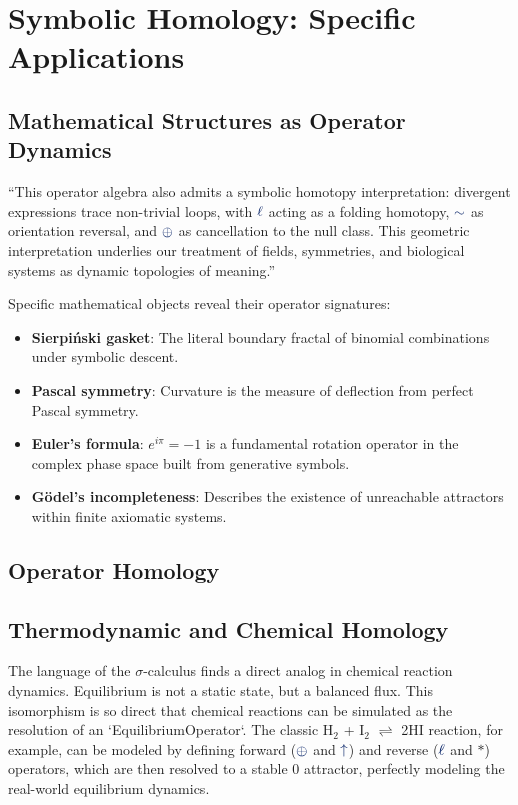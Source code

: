 \section{Symbolic Homology: Specific Applications}

\subsection{Mathematical Structures as Operator Dynamics}
“This operator algebra also admits a symbolic homotopy interpretation: divergent expressions trace non-trivial loops, with $\lha$ acting as a folding homotopy, $\reflec$ as orientation reversal, and $\fuse$ as cancellation to the null class. This geometric interpretation underlies our treatment of fields, symmetries, and biological systems as dynamic topologies of meaning.”

Specific mathematical objects reveal their operator signatures:
\begin{itemize}
    \item \textbf{Sierpiński gasket}: The literal boundary fractal of binomial combinations under symbolic descent.
    \item \textbf{Pascal symmetry}: Curvature is the measure of deflection from perfect Pascal symmetry.
    \item \textbf{Euler's formula}: $e^{i\pi} = -1$ is a fundamental rotation operator in the complex phase space built from generative symbols.
    \item \textbf{Gödel's incompleteness}: Describes the existence of unreachable attractors within finite axiomatic systems.
\end{itemize}

\subsection{Operator Homology}

\subsection{Thermodynamic and Chemical Homology}
The language of the $\sigma$-calculus finds a direct analog in chemical reaction dynamics. Equilibrium is not a static state, but a balanced flux. This isomorphism is so direct that chemical reactions can be simulated as the resolution of an `EquilibriumOperator`. The classic H$_2$ + I$_2$ $\rightleftharpoons$ 2HI reaction, for example, can be modeled by defining forward ($\fuse$ and $\grow$) and reverse ($\lha$ and $*$) operators, which are then resolved to a stable $0$ attractor, perfectly modeling the real-world equilibrium dynamics.


